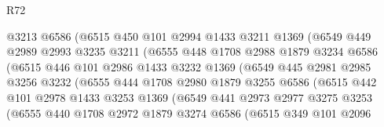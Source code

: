 \begin{lexlean}{R72}
\begin{coremodule}
                        @3213
                        @6586
                        (@6515
                          @450
                          @101
                          @2994
                          @1433
                          @3211
                          @1369
                          (@6549
                            @449
                            @2989
                            @2993
                            @3235
                            @3211
                            (@6555
                              @448
                              @1708
                              @2988
                              @1879
                              @3234
                              @6586
                              (@6515
                                @446
                                @101
                                @2986
                                @1433
                                @3232
                                @1369
                                (@6549
                                  @445
                                  @2981
                                  @2985
                                  @3256
                                  @3232
                                  (@6555
                                    @444
                                    @1708
                                    @2980
                                    @1879
                                    @3255
                                    @6586
                                    (@6515
                                      @442
                                      @101
                                      @2978
                                      @1433
                                      @3253
                                      @1369
                                      (@6549
                                        @441
                                        @2973
                                        @2977
                                        @3275
                                        @3253
                                        (@6555
                                          @440
                                          @1708
                                          @2972
                                          @1879
                                          @3274
                                          @6586
                                          (@6515
                                            @349
                                            @101
                                            @2096

\end{coremodule}
\end{lexlean}
